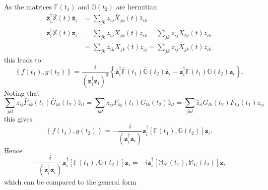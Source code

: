\documentclass[aps,preprint]{revtex4}%
\begin{document}
As the matrices $\mathbb{F}\left(  t_{1}\right)  $ and $\mathbb{G}\left(
t_{2}\right)  $ are hermitian
\begin{align}
\mathbf{\bar{z}}_{i}^{\dagger}\mathbb{\bar{X}}\left(  t\right)  \mathbf{\bar
{z}}_{i}  &  =\sum_{jk}z_{ij}\bar{X}_{jk}\left(  t\right)  \bar{z}%
_{ik}\nonumber\\
\mathbf{z}_{i}^{\dagger}\mathbb{X}\left(  t\right)  \mathbf{z}_{i}  &
=\sum_{jk}\bar{z}_{ij}X_{jk}\left(  t\right)  z_{ik}=\sum_{jk}\bar{z}_{ij}%
\bar{X}_{kj}\left(  t\right)  z_{ik}\nonumber\\
&  =\sum_{jk}\bar{z}_{ik}\bar{X}_{jk}\left(  t\right)  z_{ij}=\sum_{jk}%
z_{ij}\bar{X}_{jk}\left(  t\right)  \bar{z}_{ik}%
\end{align}
this leads to
\begin{equation}
\left\{  f\left(  t_{1}\right)  ,g\left(  t_{2}\right)  \right\}  =\frac
{i}{\left(  \mathbf{z}_{i}^{\dagger}\mathbf{z}_{i}\right)  ^{3}}\left\{
\mathbf{\bar{z}}_{i}^{\dagger}\mathbb{\bar{F}}\left(  t_{1}\right)
\mathbb{\bar{G}}\left(  t_{2}\right)  \mathbf{\bar{z}}_{i}-\mathbf{z}%
_{i}^{\dagger}\mathbb{F}\left(  t_{1}\right)  \mathbb{G}\left(  t_{2}\right)
\mathbf{z}_{i}\right\}  .
\end{equation}
Noting that
\begin{equation}
\sum_{jkl}z_{ij}\bar{F}_{jk}\left(  t_{1}\right)  \bar{G}_{kl}\left(
t_{2}\right)  \bar{z}_{il}=\sum_{jkl}z_{ij}F_{kj}\left(  t_{1}\right)
G_{lk}\left(  t_{2}\right)  \bar{z}_{il}=\sum_{jkl}\bar{z}_{il}G_{lk}\left(
t_{2}\right)  F_{kj}\left(  t_{1}\right)  z_{ij}%
\end{equation}
this gives
\begin{equation}
\left\{  f\left(  t_{1}\right)  ,g\left(  t_{2}\right)  \right\}  =-\frac
{i}{\left(  \mathbf{z}_{i}^{\dagger}\mathbf{z}_{i}\right)  }\mathbf{z}%
_{i}^{\dagger}\left[  \mathbb{F}\left(  t_{1}\right)  ,\mathbb{G}\left(
t_{2}\right)  \right]  \mathbf{z}_{i}.
\end{equation}
Hence
\begin{equation}
-\frac{i}{\left(  \mathbf{z}_{i}^{\dagger}\mathbf{z}_{i}\right)  }%
\mathbf{z}_{i}^{\dagger}\left[  \mathbb{F}\left(  t_{1}\right)  ,\mathbb{G}%
\left(  t_{2}\right)  \right]  \mathbf{z}_{i}=-i\mathbf{z}_{i}^{\dagger
}\left[  \mathbb{M}_{\mathcal{F}}\left(  t_{1}\right)  ,\mathbb{M}_{G}\left(
t_{2}\right)  \right]  \mathbf{z}_{i}%
\end{equation}
which can be compared to the general form%
\end{document}
